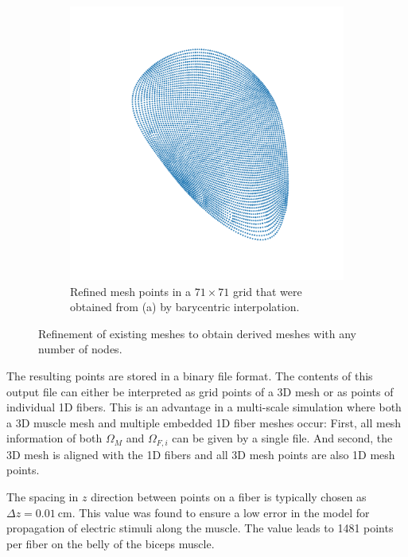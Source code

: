 \begin{figure}[H]
\begin{subfigure}[t]{0.48\textwidth}
    \includegraphics[width=\textwidth]{images/parallel_fiber_estimation/left_biceps_brachii_71x71fibers_bin_csv.pdf} %
    \caption{Refined mesh points in a $71\times 71$ grid that were obtained from (a) by barycentric interpolation.}%
    \label{fig:left_biceps_brachii_71x71fibers_bin_csv}%
  \end{subfigure}   
  \caption{Refinement of existing meshes to obtain derived meshes with any number of nodes.}%
  \label{fig:left_biceps_brachii_33x33fibers_refined}%
\end{figure}%


The resulting points are stored in a binary file format. The contents of this output file can either be interpreted as grid points of a 3D mesh or as points of individual 1D fibers. This is an advantage in a multi-scale simulation where both a 3D muscle mesh and multiple embedded 1D fiber meshes occur: First, all mesh information of both $\Omega_M$ and $\Omega_{F,i}$ can be given by a single file. And second, the 3D mesh is aligned with the 1D fibers and all 3D mesh points are also 1D mesh points. 

The spacing in $z$ direction between points on a fiber is typically chosen as $\Delta z = \SI{0.01}{\cm}$. This value was found to ensure a low error in the model for propagation of electric stimuli along the muscle. The value leads to 1481 points per fiber on the belly of the biceps muscle. 


